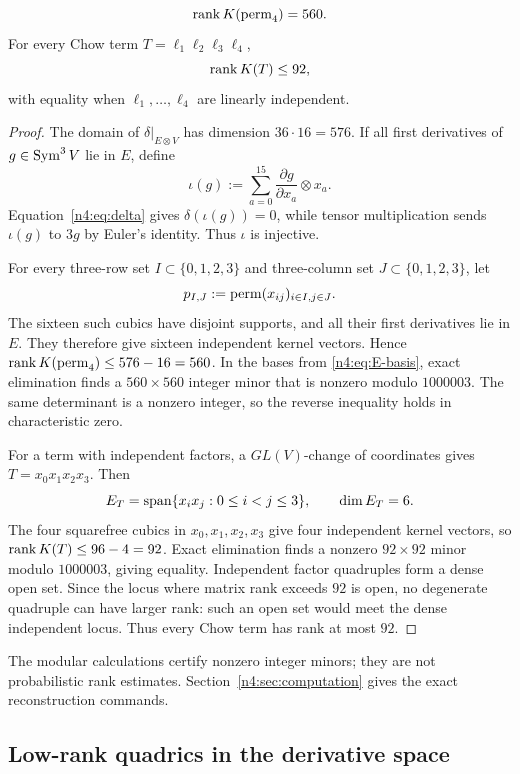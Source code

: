 \begin{proposition}\label{n4:prop:base-ranks}
\[
  \operatorname{rank} K(\operatorname{perm}_4)=560.
\]
For every Chow term \(T=\ell_1\ell_2\ell_3\ell_4\),
\[
  \operatorname{rank} K(T)\leq92,
\]
with equality when \(\ell_1,\ldots,\ell_4\) are linearly independent.
\end{proposition}

\begin{proof}
The domain of
\(\delta|_{E\otimes V}\) has dimension \(36\cdot16=576\). If all first
derivatives of \(g\in\operatorname{Sym}^3V\) lie in \(E\), define
\[
  \iota(g):=\sum_{a=0}^{15}
  \frac{\partial g}{\partial x_a}\otimes x_a.
\]
Equation~\eqref{n4:eq:delta} gives \(\delta(\iota(g))=0\), while tensor
multiplication sends \(\iota(g)\) to \(3g\) by Euler's identity. Thus
\(\iota\) is injective.

For every three-row set \(I\subset\{0,1,2,3\}\) and three-column set
\(J\subset\{0,1,2,3\}\), let
\[
  p_{I,J}:=\operatorname{perm}(x_{ij})_{i\in I,j\in J}.
\]
The sixteen such cubics have disjoint supports, and all their first
derivatives lie in \(E\). They therefore give sixteen independent kernel
vectors. Hence \(\operatorname{rank} K(\operatorname{perm}_4)\leq576-16=560\). In the bases from
\eqref{n4:eq:E-basis}, exact elimination finds a \(560\times560\) integer
minor that is nonzero modulo \(1000003\). The same determinant is a nonzero
integer, so the reverse inequality holds in characteristic zero.

For a term with independent factors, a \(GL(V)\)-change of coordinates gives
\(T=x_0x_1x_2x_3\). Then
\[
  E_T=\operatorname{span}\{x_ix_j:0\leq i<j\leq3\},\qquad \dim E_T=6.
\]
The four squarefree cubics in \(x_0,x_1,x_2,x_3\) give four independent
kernel vectors, so \(\operatorname{rank} K(T)\leq96-4=92\). Exact elimination finds a
nonzero \(92\times92\) minor modulo \(1000003\), giving equality. Independent
factor quadruples form a dense open set. Since the locus where matrix rank
exceeds \(92\) is open, no degenerate quadruple can have larger rank: such an
open set would meet the dense independent locus. Thus every Chow term has
rank at most \(92\).
\end{proof}

\begin{remark}
The modular calculations certify nonzero integer minors; they are not
probabilistic rank estimates. Section~\ref{n4:sec:computation} gives the exact
reconstruction commands.
\end{remark}

\subsection{Low-rank quadrics in the derivative space}
\label{n4:sec:classification}

